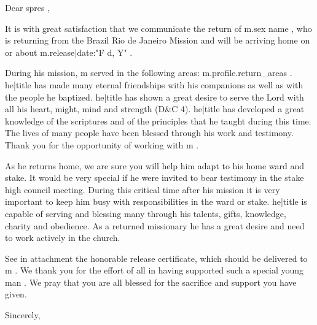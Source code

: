 \documentclass[12pt]{letter}
\begin{document}
\begin{letter}{Dear {{ spres }}, }

\opening{}

It is with great satisfaction that we communicate the return of {{ m.sex }} {{ name }}, who is returning from the Brazil Rio de Janeiro Mission and will be arriving home on or about {{ m.release|date:"F d, Y" }}.

During {{ his }} mission, {{ m }} served in the following areas: {{ m.profile.return_areas }}. {{ he|title }} has made many eternal friendships with {{ his }} companions as well as with the people {{ he }} baptized. {{ he|title }} has shown a great desire to serve the Lord with all {{ his }} heart, might, mind and strength (D\&C 4). {{ he|title }} has developed a great knowledge of the scriptures and of the principles that {{ he }} taught during this time. The lives of many people have been blessed through {{ his }} work and testimony. Thank you for the opportunity of working with {{ m }}.

As {{ he }} returns home, we are sure you will help him adapt to {{ his }} home ward and stake. It would be very special if {{ he }} were invited to bear testimony in the stake high council meeting. During this critical time after {{ his }} mission it is very important to keep him busy with responsibilities in the ward or stake. {{ he|title }} is capable of serving and blessing many through {{ his }} talents, gifts, knowledge, charity and obedience. As a returned missionary {{ he }} has a great desire and need to work actively in the church.

See in attachment the honorable release certificate, which should be delivered to {{ m }}. We thank you for the effort of all in having supported such a special young {{ man }}. We pray that you are all blessed for the sacrifice and support you have given.

\closing{Sincerely,}
\end{letter}
\end{document}
